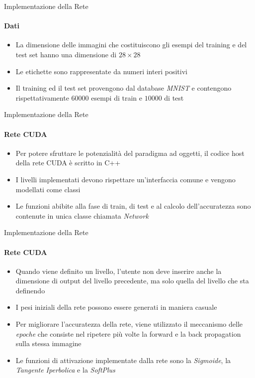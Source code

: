 \documentclass[
 ]{beamer}
\begin{document}
\begin{frame}{Implementazione della Rete}
    \framesubtitle{Dati}
    \begin{itemize} [<+->]
        \setlength\itemsep{3em}
        \item \large La dimensione delle immagini che costituiscono gli esempi del training e del test set hanno una dimensione di $28 \times 28$
        \item \large Le etichette sono rappresentate da numeri interi positivi
        \item \large Il training ed il test set provengono dal database \emph{MNIST} e contengono rispettativamente $60000$ esempi di train e $10000$ di test 
    \end{itemize}
\end{frame}

\begin{frame}{Implementazione della Rete}
    \framesubtitle{Rete CUDA}
    \begin{itemize} [<+->]
        \setlength\itemsep{2em}
        \item \large Per potere sfruttare le potenzialità del paradigma ad oggetti, il codice host della rete CUDA è scritto in C++
        \item \large I livelli implementati devono rispettare un'interfaccia comune e vengono modellati come classi
        \item \large Le funzioni abibite alla fase di train, di test e al calcolo dell'accuratezza sono contenute in unica classe chiamata \emph{Network}
    \end{itemize}
\end{frame}

\begin{frame}{Implementazione della Rete}
    \framesubtitle{Rete CUDA}
    \begin{itemize} [<+->]
        \setlength\itemsep{1em}
         \item \large Quando viene definito un livello, l'utente non deve inserire anche la dimensione di output del livello precedente, ma solo quella del livello che sta definendo
         \item \large I pesi iniziali della rete possono essere generati in maniera casuale
         \item \large Per migliorare l'accuratezza della rete, viene utilizzato il meccanismo delle \emph{epoche} che consiste nel ripetere più volte la forward e la back propagation sulla stessa immagine
        \item \large Le funzioni di attivazione implementate dalla rete sono la \emph{Sigmoide}, la \emph{Tangente Iperbolica} e la \emph{SoftPlus} 
    \end{itemize}
\end{frame}
\end{document}
